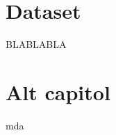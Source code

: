 \documentclass[12pt, a4paper]{report}
\begin{document}

\tableofcontents{}

\newpage{}



\newpage{}


\chapter{Dataset}

BLABLABLA



\chapter{Alt capitol}



mda
\end{document}
